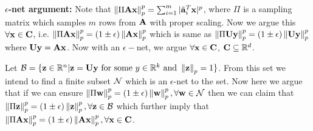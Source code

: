% 
% 
\noindent\textbf{$\epsilon$-net argument:}{\label{argument:epsNet}} Note that $\left\lVert\Pi \mathbf{A}\mathbf{x}\right\rVert_{p}^{p} = \sum_{i=1}^{m} |\tilde{\mathbf{a}}_{i}^{T}\mathbf{x}|^{p}$, where $\Pi$ is a sampling matrix which samples $m$ rows from $\mathbf{A}$ with proper scaling. Now we argue this $\forall \mathbf{x} \in \mathbf{C}$, i.e. $\left\lVert\Pi \mathbf{A}\mathbf{x}\right\rVert_{p}^{p} = (1\pm\epsilon)\left\lVert\mathbf{A}\mathbf{x}\right\rVert_{p}^{p}$ which is same as $\left\lVert\Pi \mathbf{U}\mathbf{y}\right\rVert_{p}^{p} = (1\pm\epsilon)\left\lVert\mathbf{U}\mathbf{y}\right\rVert_{p}^{p}$ where $\mathbf{U}\mathbf{y}=\mathbf{A}\mathbf{x}$. Now with an $\epsilon-$net, we argue $\forall \mathbf{x} \in \mathbf{C}$, $\mathbf{C} \subseteq \mathbb{R}^{d}$. 

Let $\mathbf{\mathcal{B}} = \{ \mathbf{z} \in \mathbb{R}^{n} \vert \mathbf{z} = \mathbf{U}\mathbf{y} \mbox{ for some } y \in \mathbb{R}^{k} \mbox{ and } \left\lVert\mathbf{z}\right\rVert_{p} = 1 \}$. From this set we intend to find a finite subset $\mathbf{\mathcal{N}}$ which is an $\epsilon$-net to the set. Now here we argue that if we can ensure $\left\lVert\Pi \mathbf{w}\right\rVert_{p}^{p} = (1\pm\epsilon)\left\lVert\mathbf{w}\right\rVert_{p}^{p}, \forall \mathbf{w} \in \mathbf{\mathcal{N}}$ then we can claim that $\left\lVert\Pi \mathbf{z}\right\rVert_{p}^{p} = (1\pm\epsilon)\left\lVert\mathbf{z}\right\rVert_{p}^{p}, \forall \mathbf{z} \in \mathbf{\mathcal{B}}$ which further imply that $\left\lVert\Pi \mathbf{A}\mathbf{x}\right\rVert_{p}^{p} = (1\pm\epsilon)\left\lVert\mathbf{A}\mathbf{x}\right\rVert_{p}^{p}, \forall \mathbf{x} \in \mathbf{C}$.

